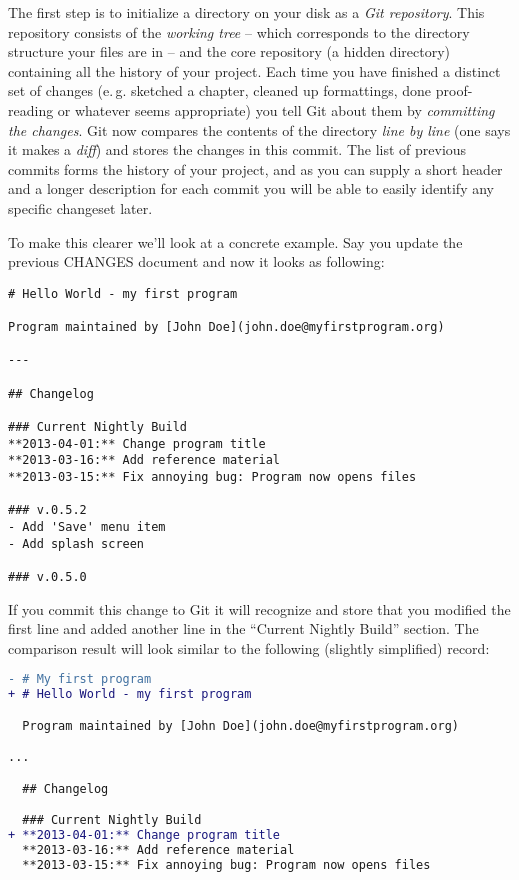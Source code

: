 \documentclass[../../LilyPond-Tutorials]{subfiles}
\begin{document}
The first step is to initialize a directory on your disk as a \emph{Git repository}.
This repository consists of the \emph{working tree} -- which corresponds to the directory structure your files are in -- and the core repository (a hidden directory) containing all the history of your project.
Each time you have finished a distinct set of changes (e.\,g. sketched a chapter, cleaned up formattings, done proof-reading or whatever seems appropriate) you tell Git about them by \emph{committing the changes}.
Git now compares the contents of the directory \emph{line by line} (one says it makes a \emph{diff}) and stores the changes in this commit.
The list of previous commits forms the history of your project, and as you can supply a short header and a longer description for each commit you will be able to easily identify any specific changeset later.

To make this clearer we'll look at a concrete example.
Say you update the previous CHANGES document and now it looks as following:
\begin{lstlisting}[frame=single]
# Hello World - my first program

Program maintained by [John Doe](john.doe@myfirstprogram.org)

---

## Changelog

### Current Nightly Build
**2013-04-01:** Change program title  
**2013-03-16:** Add reference material  
**2013-03-15:** Fix annoying bug: Program now opens files

### v.0.5.2
- Add 'Save' menu item
- Add splash screen

### v.0.5.0
\end{lstlisting}

If you commit this change to Git it will recognize and store that you modified the first line and added another line in the “Current Nightly Build” section.
The comparison result will look similar to the following (slightly simplified) record:

\begin{lstlisting}[language=diff, frame=single]
- # My first program
+ # Hello World - my first program

  Program maintained by [John Doe](john.doe@myfirstprogram.org)

...

  ## Changelog

  ### Current Nightly Build
+ **2013-04-01:** Change program title  
  **2013-03-16:** Add reference material  
  **2013-03-15:** Fix annoying bug: Program now opens files
\end{lstlisting}
\end{document}

